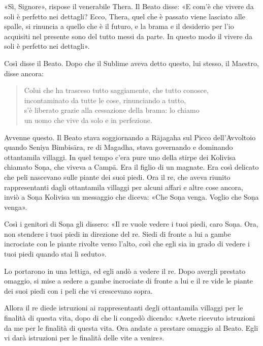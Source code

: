 «Sì, Signore», rispose il venerabile Thera. Il Beato disse: «E com’è che
vivere da soli è perfetto nei dettagli? Ecco, Thera, quel che è passato
viene lasciato alle spalle, si rinuncia a quello che è il futuro, e la
brama e il desiderio per l’io acquisiti nel presente sono del tutto
messi da parte. In questo modo il vivere da soli è perfetto nei
dettagli».


Così disse il Beato. Dopo che il Sublime aveva detto questo, lui stesso,
il Maestro, disse ancora:


\begin{quote}
Colui che ha trasceso tutto saggiamente, che tutto conosce, \\
incontaminato da tutte le cose, rinunciando a tutto, \\
s’è liberato grazie alla cessazione della brama: lo chiamo \\
un uomo che vive da solo e in perfezione.
\end{quote}



 Avvenne questo. Il Beato stava soggiornando a Rājagaha sul
Picco dell’Avvoltoio quando Seniya Bimbisāra, re di Magadha, stava
governando e dominando ottantamila villaggi. In quel tempo c’era pure
uno della stirpe dei Kolivisa chiamato Soṇa, che viveva a Campā. Era il
figlio di un magnate. Era così delicato che peli nascevano sulle piante
dei suoi piedi. Ora il re, che aveva riunito rappresentanti dagli
ottantamila villaggi per alcuni affari e altre cose ancora, inviò a Soṇa
Kolivisa un messaggio che diceva: «Che Soṇa venga. Voglio che Soṇa
venga».


Così i genitori di Soṇa gli dissero: «Il re vuole vedere i tuoi piedi,
caro Soṇa. Ora, non stendere i tuoi piedi in direzione del re. Siedi di
fronte a lui a gambe incrociate con le piante rivolte verso l’alto, così
che egli sia in grado di vedere i tuoi piedi quando stai lì seduto».


Lo portarono in una lettiga, ed egli andò a vedere il re. Dopo avergli
prestato omaggio, si mise a sedere a gambe incrociate di fronte a lui e
il re vide le piante dei suoi piedi con i peli che vi crescevano sopra.


Allora il re diede istruzioni ai rappresentanti degli ottantamila
villaggi per le finalità di questa vita, dopo di che li congedò dicendo:
«Avete ricevuto istruzioni da me per le finalità di questa vita. Ora
andate a prestare omaggio al Beato. Egli vi darà istruzioni per le
finalità delle vite a venire».


